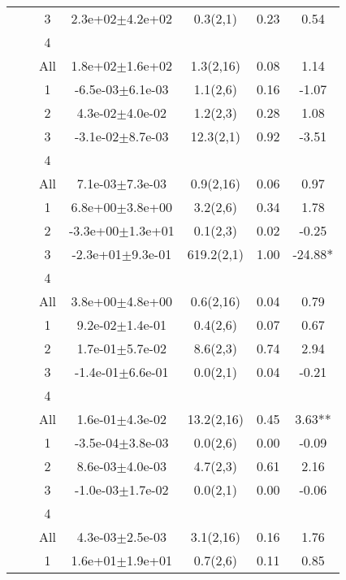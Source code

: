 \begin{longtable}{llccccS[table-format=-2.2, table-space-text-post = {***}]}
   &  & 3 &  2.3e+02$\pm$4.2e+02 & 0.3(2,1) & 0.23 & 0.54 \\ 
   &  & 4 &  &  &  &  \\ 
   &  & All &  1.8e+02$\pm$1.6e+02 & 1.3(2,16) & 0.08 & 1.14 \\ 
   \midrule
{} & {} & 1 & -6.5e-03$\pm$6.1e-03 & 1.1(2,6) & 0.16 & -1.07 \\ 
   &  & 2 &  4.3e-02$\pm$4.0e-02 & 1.2(2,3) & 0.28 & 1.08 \\ 
   &  & 3 & -3.1e-02$\pm$8.7e-03 & 12.3(2,1) & 0.92 & -3.51 \\ 
   &  & 4 &  &  &  &  \\ 
   &  & All &  7.1e-03$\pm$7.3e-03 & 0.9(2,16) & 0.06 & 0.97 \\ 
   \midrule
{} & {} & 1 &  6.8e+00$\pm$3.8e+00 & 3.2(2,6) & 0.34 & 1.78 \\ 
   &  & 2 & -3.3e+00$\pm$1.3e+01 & 0.1(2,3) & 0.02 & -0.25 \\ 
   &  & 3 & -2.3e+01$\pm$9.3e-01 & 619.2(2,1) & 1.00 & -24.88* \\ 
   &  & 4 &  &  &  &  \\ 
   &  & All &  3.8e+00$\pm$4.8e+00 & 0.6(2,16) & 0.04 & 0.79 \\ 
   \midrule
{} & {} & 1 &  9.2e-02$\pm$1.4e-01 & 0.4(2,6) & 0.07 & 0.67 \\ 
   &  & 2 &  1.7e-01$\pm$5.7e-02 & 8.6(2,3) & 0.74 & 2.94 \\ 
   &  & 3 & -1.4e-01$\pm$6.6e-01 & 0.0(2,1) & 0.04 & -0.21 \\ 
   &  & 4 &  &  &  &  \\ 
   &  & All &  1.6e-01$\pm$4.3e-02 & 13.2(2,16) & 0.45 & 3.63** \\ 
   \midrule
{} & {} & 1 & -3.5e-04$\pm$3.8e-03 & 0.0(2,6) & 0.00 & -0.09 \\ 
   &  & 2 &  8.6e-03$\pm$4.0e-03 & 4.7(2,3) & 0.61 & 2.16 \\ 
   &  & 3 & -1.0e-03$\pm$1.7e-02 & 0.0(2,1) & 0.00 & -0.06 \\ 
   &  & 4 &  &  &  &  \\ 
   &  & All &  4.3e-03$\pm$2.5e-03 & 3.1(2,16) & 0.16 & 1.76 \\ 
   \midrule
{} & {} & 1 &  1.6e+01$\pm$1.9e+01 & 0.7(2,6) & 0.11 & 0.85 \\ 

\end{longtable}
